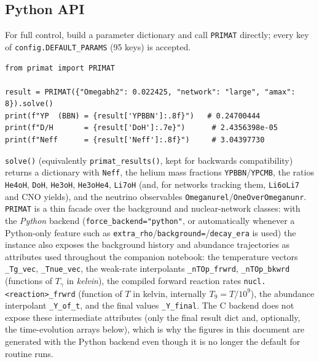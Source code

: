 \documentclass[11pt,a4paper]{article}
\newcommand{\Tg}{T_\gamma}
\newcommand{\code}[1]{\texttt{#1}}
\begin{document}
\subsection{Python API}
For full control, build a parameter dictionary and call \code{PRIMAT}
directly; every key of \code{config.DEFAULT\_PARAMS} (95 keys) is accepted.
\begin{lstlisting}[style=py]
from primat import PRIMAT

result = PRIMAT({"Omegabh2": 0.022425, "network": "large", "amax": 8}).solve()
print(f"YP  (BBN) = {result['YPBBN']:.8f}")   # 0.24700444
print(f"D/H       = {result['DoH']:.7e}")      # 2.4356398e-05
print(f"Neff      = {result['Neff']:.8f}")     # 3.04397730
\end{lstlisting}
\code{solve()} (equivalently \code{primat\_results()}, kept for backwards
compatibility) returns a dictionary with \code{Neff}, the helium mass
fractions \code{YPBBN}/\code{YPCMB}, the ratios \code{He4oH}, \code{DoH}, \code{He3oH},
\code{He3oHe4}, \code{Li7oH} (and, for networks tracking them, \code{Li6oLi7}
and CNO yields), and the neutrino observables
\code{Omeganurel}/\code{OneOverOmeganunr}. \code{PRIMAT} is a thin facade over
the background and nuclear-network classes: with the \emph{Python} backend
(\code{force\_backend="python"}, or automatically whenever a Python-only
feature such as \code{extra\_rho}/\code{background=}/\code{decay\_era} is
used) the instance also exposes the background history and abundance
trajectories as attributes used throughout the companion notebook: the
temperature vectors \code{\_Tg\_vec}, \code{\_Tnue\_vec}, the weak-rate
interpolants \code{\_nTOp\_frwrd}, \code{\_nTOp\_bkwrd} (functions of $\Tg$ in
\emph{kelvin}), the compiled forward reaction rates
\code{nucl.<reaction>\_frwrd} (function of $T$ in kelvin, internally
$T_9=T/10^9$), the abundance interpolant \code{\_Y\_of\_t}, and the final
values \code{\_Y\_final}. The C backend does not expose these
intermediate attributes (only the final result dict and, optionally, the
time-evolution arrays below), which is why the figures in this document are
generated with the Python backend even though it is no longer the default
for routine runs.
\end{document}
